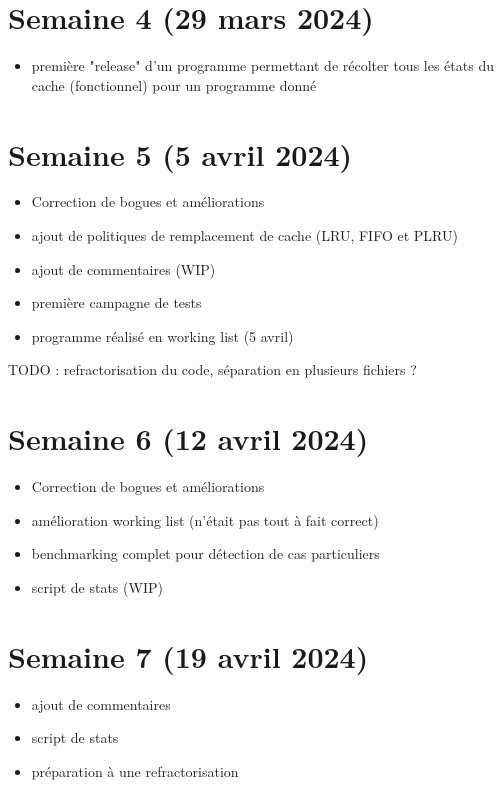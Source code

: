 \documentclass[a4paper,12pt]{article}
\begin{document}
\section{Semaine 4 (29 mars 2024)}

\begin{itemize}
  \item première "release" d'un programme permettant de récolter tous les états du cache (fonctionnel) pour un programme donné
\end{itemize}

\section{Semaine 5 (5 avril 2024)}

\begin{itemize}
  \item Correction de bogues et améliorations
  \item ajout de politiques de remplacement de cache (LRU, FIFO et PLRU)
  \item ajout de commentaires (WIP)
  \item première campagne de tests
  \item programme réalisé en working list (5 avril)
\end{itemize}


TODO : refractorisation du code, séparation en plusieurs fichiers ?

\section{Semaine 6 (12 avril 2024)}

\begin{itemize}
  \item Correction de bogues et améliorations
  \item amélioration working list (n'était pas tout à fait correct)
  \item benchmarking complet pour détection de cas particuliers
  \item script de stats (WIP)
\end{itemize}


\section{Semaine 7 (19 avril 2024)}

\begin{itemize}
  \item ajout de commentaires
  \item script de stats
  \item préparation à une refractorisation
\end{itemize}
  
\end{document}
